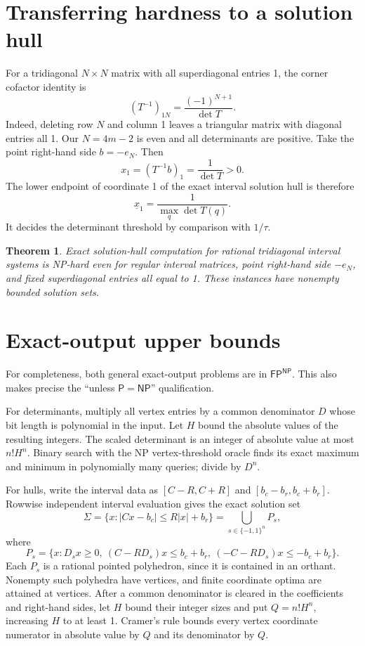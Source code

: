 \documentclass[11pt,a4paper]{article}
\newtheorem{theorem}{Theorem}
\theoremstyle{remark}\newtheorem{remark}[theorem]{Remark}
\newcommand{\NP}{\mathsf{NP}}
\begin{document}
\section{Transferring hardness to a solution hull}
For a tridiagonal $N\times N$ matrix with all superdiagonal entries 1, the corner cofactor identity is
\[
 (T^{-1})_{1N}=\frac{(-1)^{N+1}}{\det T}.
\]
Indeed, deleting row $N$ and column 1 leaves a triangular matrix with diagonal entries all 1. Our $N=4m-2$ is even and all determinants are positive. Take the point right-hand side $b=-e_N$. Then
\[
 x_1=(T^{-1}b)_1=\frac1{\det T}>0.
\]
The lower endpoint of coordinate 1 of the exact interval solution hull is therefore
\[
 \underline{x}_1=\frac1{\max_q\det T(q)}.
\]
It decides the determinant threshold by comparison with $1/\tau$.
\begin{theorem}\label{thm:hull}
Exact solution-hull computation for rational tridiagonal interval systems is NP-hard even for regular interval matrices, point right-hand side $-e_N$, and fixed superdiagonal entries all equal to 1. These instances have nonempty bounded solution sets.
\end{theorem}
\section{Exact-output upper bounds}
For completeness, both general exact-output problems are in $\mathsf{FP}^{\NP}$. This also makes precise the ``unless $\mathsf P=\mathsf{NP}$'' qualification.

For determinants, multiply all vertex entries by a common denominator $D$ whose bit length is polynomial in the input. Let $H$ bound the absolute values of the resulting integers. The scaled determinant is an integer of absolute value at most $n!H^n$. Binary search with the NP vertex-threshold oracle finds its exact maximum and minimum in polynomially many queries; divide by $D^n$.

For hulls, write the interval data as $[C-R,C+R]$ and $[b_c-b_r,b_c+b_r]$. Rowwise independent interval evaluation gives the exact solution set
\[
 \Sigma=\{x:|Cx-b_c|\le R|x|+b_r\}
       =\bigcup_{s\in\{-1,1\}^n}P_s,
\]
where
\[
 P_s=\{x:D_sx\ge0,\ (C-RD_s)x\le b_c+b_r,
                 \ (-C-RD_s)x\le-b_c+b_r\}.
\]
Each $P_s$ is a rational pointed polyhedron, since it is contained in an orthant. Nonempty such polyhedra have vertices, and finite coordinate optima are attained at vertices. After a common denominator is cleared in the coefficients and right-hand sides, let $H$ bound their integer sizes and put $Q=n!H^n$, increasing $H$ to at least 1. Cramer's rule bounds every vertex coordinate numerator in absolute value by $Q$ and its denominator by $Q$.
\end{document}
